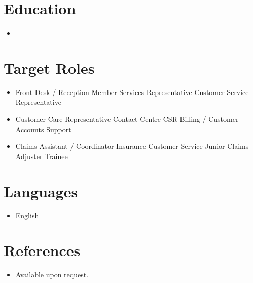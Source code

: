 \documentclass[11pt,a4paper,sans]{moderncv}
\begin{document}
\section{Education}
\vspace{1pt}
\begin{itemize}
\item{}
\end{itemize}

\section{Target Roles}
\vspace{1pt}
\begin{itemize}
\item Front Desk / Reception \textbullet{} Member Services Representative \textbullet{} Customer Service Representative
\item Customer Care Representative \textbullet{} Contact Centre CSR \textbullet{} Billing / Customer Accounts Support
\item Claims Assistant / Coordinator \textbullet{} Insurance Customer Service \textbullet{} Junior Claims Adjuster Trainee
\end{itemize}

\section{Languages}
\vspace{1pt}
\begin{itemize}
\item English
\end{itemize}

\section{References}
\vspace{1pt}
\begin{itemize}
\item{Available upon request.}
\end{itemize}
\end{document}
